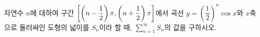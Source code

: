 \hspace*{2mm}\begin{minipage}[t]{\dimexpr\linewidth-2mm\relax}\vspace{0pt}
자연수 $n$에 대하여 구간 $\left[\left(n-\dfrac{1}{2}\right)\pi{,}\mkern3mu\mathopen{}\left(n+\dfrac{1}{2}\right)\pi\right]$에서 곡선 $y=\left(\dfrac{1}{2}\right)^n\cos x$와 $x$축으로 둘러싸인 도형의 넓이를 $S_n$이라 할 때, $\displaystyle\sum_{n=1}^{\infty}S_n$의 값을 구하시오.\end{minipage}
